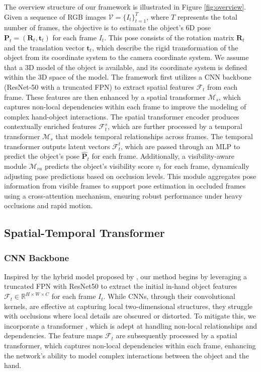 The overview structure of our framework is illustrated in Figure \ref{fig:overview}. Given a sequence of RGB images $\mathcal{V} = \lbrace I_t \rbrace_{t=1}^{T}$, where $T$ represents the total number of frames, the objective is to estimate the object's 6D pose $\mathbf{P}_t = (\mathbf{R}_t, \mathbf{t}_t)$ for each frame $I_t$. This pose consists of the rotation matrix $\mathbf{R}_t$ and the translation vector $\mathbf{t}_t$, which describe the rigid transformation of the object from its coordinate system to the camera coordinate system. We assume that a 3D model of the object is available, and its coordinate system is defined within the 3D space of the model. The framework first utilizes a CNN backbone (ResNet-50 with a truncated FPN) to extract spatial features \( \mathcal{F}_t \) from each frame. These features are then enhanced by a spatial transformer $\mathcal{M}_{s}$, which captures non-local dependencies within each frame to improve the modeling of complex hand-object interactions. The spatial transformer encoder produces contextually enriched features \( \mathcal{F}^s_t \), which are further processed by a temporal transformer $\mathcal{M}_{s}$ that models temporal relationships across frames. The temporal transformer outputs latent vectors \( \mathcal{F}^t_t \), which are passed through an MLP to predict the object's pose \( \hat{\mathbf{P}}_t \) for each frame. Additionally, a visibility-aware module $\mathcal{M}_{va}$ predicts the object's visibility score \( v_t \) for each frame, dynamically adjusting pose predictions based on occlusion levels. This module aggregates pose information from visible frames to support pose estimation in occluded frames using a cross-attention mechanism, ensuring robust performance under heavy occlusions and rapid motion.

\subsection{Spatial-Temporal Transformer}

\subsubsection{CNN Backbone}

Inspired by the hybrid model proposed by \cite{carion2020end}, our method begins by leveraging a truncated FPN \cite{lin2017feature} with ResNet50 \cite{he2016deep} to extract the initial in-hand object features $\mathcal{F}_t \in \mathbb{R}^{H \times W \times C}$ for each frame $I_t$. While CNNs, through their convolutional kernels, are effective at capturing local two-dimensional structures, they struggle with occlusions where local details are obscured or distorted. To mitigate this, we incorporate a transformer \cite{vaswani2017attention}, which is adept at handling non-local relationships and dependencies. The feature maps $\mathcal{F}_t$ are subsequently processed by a spatial transformer, which captures non-local dependencies within each frame, enhancing the network's ability to model complex interactions between the object and the hand.

